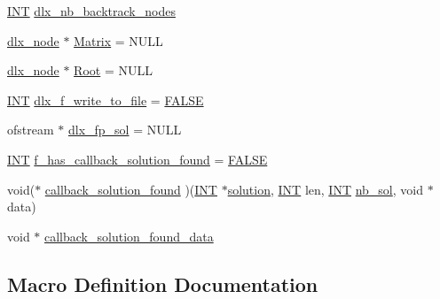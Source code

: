 \begin{DoxyCompactItemize}
\item 
\mbox{\hyperlink{galois_8h_a09fddde158a3a20bd2dcadb609de11dc}{I\+NT}} \mbox{\hyperlink{_l_i_b_2_g_a_l_o_i_s_2dlx_8_c_a42c83b4af4bfd890294b20a6f93890bd}{dlx\+\_\+nb\+\_\+backtrack\+\_\+nodes}}
\item 
\mbox{\hyperlink{structdlx__node}{dlx\+\_\+node}} $\ast$ \mbox{\hyperlink{_l_i_b_2_g_a_l_o_i_s_2dlx_8_c_a50d311ef33ad3f9dccc625d35230711a}{Matrix}} = N\+U\+LL
\item 
\mbox{\hyperlink{structdlx__node}{dlx\+\_\+node}} $\ast$ \mbox{\hyperlink{_l_i_b_2_g_a_l_o_i_s_2dlx_8_c_ac57fd0673effdad6be599034bdec1647}{Root}} = N\+U\+LL
\item 
\mbox{\hyperlink{galois_8h_a09fddde158a3a20bd2dcadb609de11dc}{I\+NT}} \mbox{\hyperlink{_l_i_b_2_g_a_l_o_i_s_2dlx_8_c_a713d2b13e3ac2d16e321722833d85dc1}{dlx\+\_\+f\+\_\+write\+\_\+to\+\_\+file}} = \mbox{\hyperlink{nauty_8h_aa93f0eb578d23995850d61f7d61c55c1}{F\+A\+L\+SE}}
\item 
ofstream $\ast$ \mbox{\hyperlink{_l_i_b_2_g_a_l_o_i_s_2dlx_8_c_a6cc0da659d9a316900b2b587b91204db}{dlx\+\_\+fp\+\_\+sol}} = N\+U\+LL
\item 
\mbox{\hyperlink{galois_8h_a09fddde158a3a20bd2dcadb609de11dc}{I\+NT}} \mbox{\hyperlink{_l_i_b_2_g_a_l_o_i_s_2dlx_8_c_acee106d30d80436cf2089f4845e6dd88}{f\+\_\+has\+\_\+callback\+\_\+solution\+\_\+found}} = \mbox{\hyperlink{nauty_8h_aa93f0eb578d23995850d61f7d61c55c1}{F\+A\+L\+SE}}
\item 
void($\ast$ \mbox{\hyperlink{_l_i_b_2_g_a_l_o_i_s_2dlx_8_c_a2cb295d6c07a8de393c5107d81da5066}{callback\+\_\+solution\+\_\+found}} )(\mbox{\hyperlink{galois_8h_a09fddde158a3a20bd2dcadb609de11dc}{I\+NT}} $\ast$\mbox{\hyperlink{hill_8_c_a260dc4df2fddf5f0fa5dd8d5b8210a11}{solution}}, \mbox{\hyperlink{galois_8h_a09fddde158a3a20bd2dcadb609de11dc}{I\+NT}} len, \mbox{\hyperlink{galois_8h_a09fddde158a3a20bd2dcadb609de11dc}{I\+NT}} \mbox{\hyperlink{plane__search_8_c_a0029b734487624c93c3a72d74a8f2bf9}{nb\+\_\+sol}}, void $\ast$data)
\item 
void $\ast$ \mbox{\hyperlink{_l_i_b_2_g_a_l_o_i_s_2dlx_8_c_ae9d310daba961531412b89f2a32f6b09}{callback\+\_\+solution\+\_\+found\+\_\+data}}
\end{DoxyCompactItemize}


\subsection{Macro Definition Documentation}
\mbox{\label{_l_i_b_2_g_a_l_o_i_s_2dlx_8_c_af0bedc019ea81b4c55265b23b8c312a3}} 
